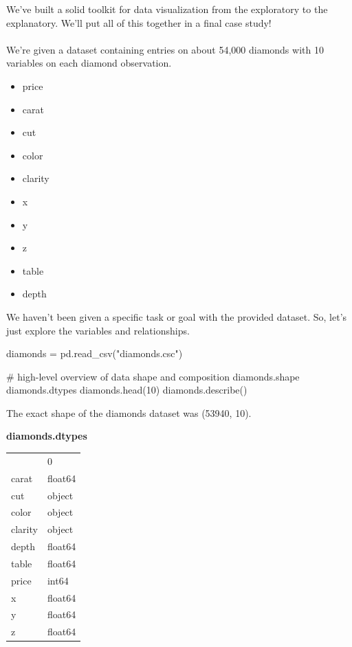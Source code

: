 We've built a solid toolkit for data visualization from the exploratory to the explanatory. We'll put all of this together in a final case study!
\\\\
We're given a dataset containing entries on about 54,000 diamonds with 10 variables on each diamond observation.

\begin{itemize}
	\item price
	\item carat
	\item cut
	\item color
	\item clarity
	\item x
	\item y
	\item z
	\item table
	\item depth
\end{itemize}

We haven't been given a specific task or goal with the provided dataset. So, let's just explore the variables and relationships.

\begin{python}
	diamonds = pd.read_csv("diamonds.csc")
	
	# high-level overview of data shape and composition
	diamonds.shape
	diamonds.dtypes
	diamonds.head(10)
	diamonds.describe()
\end{python}

The exact shape of the diamonds dataset was (53940, 10).

\textbf{diamonds.dtypes}
\begin{center}
	\begin{tabular}{ll}
		{} &        0 \\
		carat   &  float64 \\
		cut     &   object \\
		color   &   object \\
		clarity &   object \\
		depth   &  float64 \\
		table   &  float64 \\
		price   &    int64 \\
		x       &  float64 \\
		y       &  float64 \\
		z       &  float64 \\
	\end{tabular}
\end{center}

